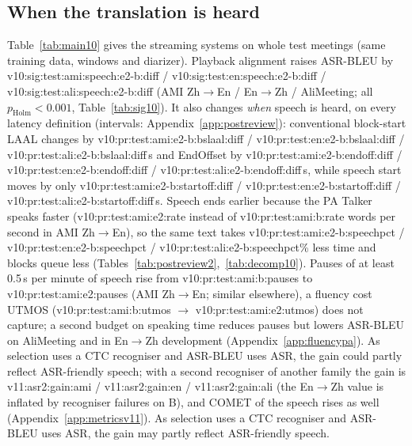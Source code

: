 \subsection{When the translation is heard}
\label{sec:res-pa}
\label{sec:res-v10}



Table~\ref{tab:main10} gives the streaming systems on whole test meetings (same training data, windows and
diarizer). Playback alignment raises ASR-BLEU by
\num{v10:sig:test:ami:speech:e2-b:diff} / \num{v10:sig:test:en:speech:e2-b:diff} /
\num{v10:sig:test:ali:speech:e2-b:diff} (AMI Zh$\rightarrow$En / En$\rightarrow$Zh / AliMeeting; all
$p_\text{Holm}<0.001$, Table~\ref{tab:sig10}). It also changes \emph{when} speech is heard, on every latency definition (intervals:
Appendix~\ref{app:postreview}): conventional block-start LAAL changes by \num{v10:pr:test:ami:e2-b:bslaal:diff} /
\num{v10:pr:test:en:e2-b:bslaal:diff} / \num{v10:pr:test:ali:e2-b:bslaal:diff}\,s and EndOffset by \num{v10:pr:test:ami:e2-b:endoff:diff} / \num{v10:pr:test:en:e2-b:endoff:diff} /
\num{v10:pr:test:ali:e2-b:endoff:diff}\,s, while speech start moves by only \num{v10:pr:test:ami:e2-b:startoff:diff} /
\num{v10:pr:test:en:e2-b:startoff:diff} / \num{v10:pr:test:ali:e2-b:startoff:diff}\,s. Speech ends earlier because
the PA Talker speaks faster (\num{v10:pr:test:ami:e2:rate} instead of \num{v10:pr:test:ami:b:rate} words per second
in AMI Zh$\rightarrow$En), so the same text takes \num{v10:pr:test:ami:e2-b:speechpct} /
\num{v10:pr:test:en:e2-b:speechpct} / \num{v10:pr:test:ali:e2-b:speechpct}\% less time and blocks queue less
(Tables~\ref{tab:postreview2},~\ref{tab:decomp10}). Pauses of at least 0.5\,s per minute of speech rise from
\num{v10:pr:test:ami:b:pauses} to \num{v10:pr:test:ami:e2:pauses} (AMI Zh$\rightarrow$En; similar elsewhere), a fluency cost
UTMOS (\num{v10:pr:test:ami:b:utmos} $\rightarrow$ \num{v10:pr:test:ami:e2:utmos}) does not capture\ifFluencyPA{}; a second budget on speaking time reduces pauses but lowers ASR-BLEU on
AliMeeting and in En$\rightarrow$Zh development (Appendix~\ref{app:fluencypa})\fi.
\ifMetricsV
As selection uses a CTC recogniser and ASR-BLEU uses ASR, the gain could partly reflect ASR-friendly speech; with a
second recogniser of another family the gain is \num{v11:asr2:gain:ami} / \num{v11:asr2:gain:en} /
\num{v11:asr2:gain:ali} (the En$\rightarrow$Zh value is inflated by recogniser failures on B), and COMET of the
speech rises as well (Appendix~\ref{app:metricsv11}).
\else
As selection uses a CTC recogniser and ASR-BLEU uses ASR, the gain may partly reflect ASR-friendly speech.
\fi

